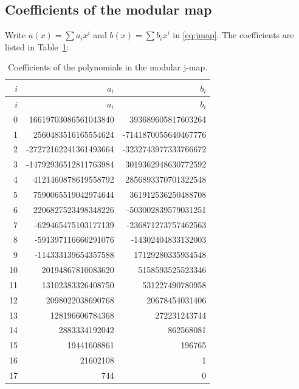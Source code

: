 \documentclass[11pt,a4paper]{article}
\theoremstyle{definition}\newtheorem{definition}[theorem]{Definition}
\theoremstyle{remark}\newtheorem{remark}[theorem]{Remark}
\begin{document}
\subsection{Coefficients of the modular map}\label{app:jmap}
Write $a(x)=\sum a_i x^i$ and $b(x)=\sum b_i x^i$ in \eqref{eq:jmap}. The coefficients are listed in Table~\ref{tab:A-1}:
\begingroup\small
\begin{longtable}{r r r}
\caption{Coefficients of the polynomials in the modular j-map.}\label{tab:A-1}\\
\toprule $i$&$a_i$&$b_i$\\\midrule\endfirsthead
\toprule $i$&$a_i$&$b_i$\\\midrule\endhead
0&16619703086561043840&393689605817603264\\
1&2560483516165554624&-7141870055640467776\\
2&-27272162241361493664&-3232743977333766672\\
3&-14792936512811763984&3019362948630772592\\
4&4121460878619558792&2856893370701322548\\
5&7590065519042974644&361912536250488708\\
6&2206827523498348226&-503002839579031251\\
7&-629465475103177139&-236871273757462563\\
8&-591397116666291076&-14302404833132003\\
9&-114333139654357588&17129280335934548\\
10&20194867810083620&5158593525523346\\
11&13102383326408750&531227490780958\\
12&2098022038690768&20678454031406\\
13&128196606784368&272231243744\\
14&2883334192042&862568081\\
15&19441608861&196765\\
16&21602108&1\\
17&744&0\\
\bottomrule\end{longtable}\endgroup
\end{document}

